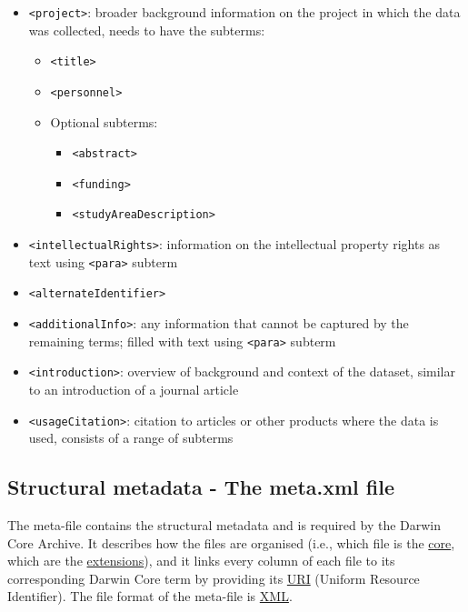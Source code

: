 \documentclass[
  oneside]{book}
\providecommand{\tightlist}{%
  \setlength{\itemsep}{0pt}\setlength{\parskip}{0pt}}
\begin{document}
\begin{itemize}
\item
  {\texttt{\textless{}project\textgreater{}}}: broader background information on the project in which the data was collected, needs to have the subterms:

  \begin{itemize}
  \tightlist
  \item
    \texttt{\textless{}title\textgreater{}}
  \item
    \texttt{\textless{}personnel\textgreater{}}
  \item
    Optional subterms:

    \begin{itemize}
    \tightlist
    \item
      \texttt{\textless{}abstract\textgreater{}}
    \item
      \texttt{\textless{}funding\textgreater{}}
    \item
      \texttt{\textless{}studyAreaDescription\textgreater{}}
    \end{itemize}
  \end{itemize}
\item
  {\texttt{\textless{}intellectualRights\textgreater{}}}: information on the intellectual property rights as text using \texttt{\textless{}para\textgreater{}} subterm
\item
  {\texttt{\textless{}alternateIdentifier\textgreater{}}}
\item
  {\texttt{\textless{}additionalInfo\textgreater{}}}: any information that cannot be captured by the remaining terms; filled with text using \texttt{\textless{}para\textgreater{}} subterm
\item
  {\texttt{\textless{}introduction\textgreater{}}}: overview of background and context of the dataset, similar to an introduction of a journal article
\item
  {\texttt{\textless{}usageCitation\textgreater{}}}: citation to articles or other products where the data is used, consists of a range of subterms
\end{itemize}

\subsection{Structural metadata - The meta.xml file}\label{structural-metadata}

The meta-file contains the structural metadata and is required by the Darwin Core Archive. It describes how the files are organised (i.e., which file is the \hyperref[core]{core}, which are the \hyperref[extension]{extensions}), and it links every column of each file to its corresponding Darwin Core term by providing its \hyperref[URI]{URI} (Uniform Resource Identifier). The file format of the meta-file is \hyperref[xml]{XML}.
\end{document}
